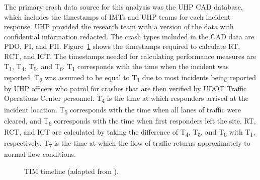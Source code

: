 \documentclass[
  letterpaper,
  authoryear]{elsarticle}
\begin{document}
The primary crash data source for this analysis was the UHP CAD
database, which includes the timestamps of IMTs and UHP teams for each
incident response. UHP provided the research team with a version of the
data with confidential information redacted. The crash types included in
the CAD data are PDO, PI, and FII. Figure~\ref{fig-TIM_Timeline} shows
the timestamps required to calculate RT, RCT, and ICT. The timestamps
needed for calculating performance measures are T\textsubscript{1},
T\textsubscript{4}, T\textsubscript{5}, and T\textsubscript{6}.
T\textsubscript{1} corresponds with the time when the incident was
reported. T\textsubscript{2} was assumed to be equal to
T\textsubscript{1} due to most incidents being reported by UHP officers
who patrol for crashes that are then verified by UDOT Traffic Operations
Center personnel. T\textsubscript{4} is the time at which responders
arrived at the incident location. T\textsubscript{5} corresponds with
the time when all lanes of traffic were cleared, and T\textsubscript{6}
corresponds with the time when first responders left the site. RT, RCT,
and ICT are calculated by taking the difference of T\textsubscript{4},
T\textsubscript{5}, and T\textsubscript{6} with T\textsubscript{1},
respectively. T\textsubscript{7} is the time at which the flow of
traffic returns approximately to normal flow conditions.

\begin{figure}


\caption{\label{fig-TIM_Timeline}TIM timeline (adapted from
\citet{conkliin_data_2013}).}

\end{figure}%
\end{document}

